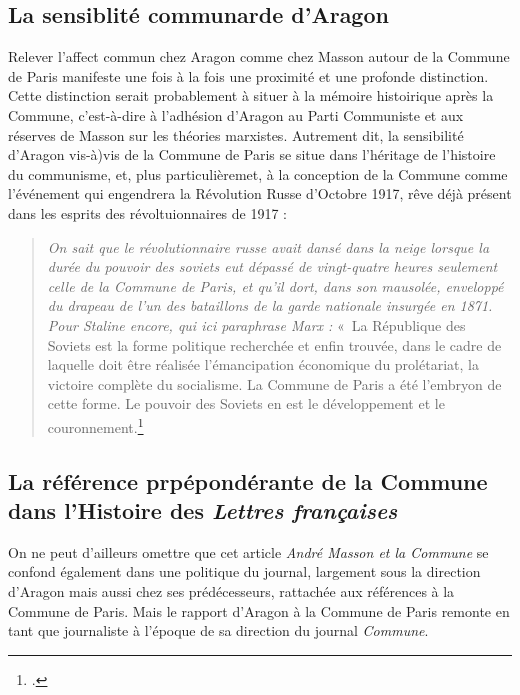 \subsection{La sensiblité communarde d'Aragon}

Relever l'affect commun chez Aragon comme chez Masson autour de la Commune de Paris manifeste une fois à la fois une proximité et une profonde distinction. Cette distinction serait probablement à situer à la mémoire histoirique après la Commune, c'est-à-dire à l'adhésion d'Aragon au Parti Communiste et aux réserves de Masson sur les théories marxistes. Autrement dit, la sensibilité d'Aragon vis-à)vis de la Commune de Paris se situe dans l'héritage de l'histoire du communisme, et, plus particulièremet, à la conception de la Commune comme l'événement qui engendrera la Révolution Russe d'Octobre 1917, rêve déjà présent dans les esprits des révoltuionnaires de 1917 : 

\begin{quote}
\emph{On sait que le révolutionnaire russe avait dansé dans la neige lorsque la durée du pouvoir des soviets eut dépassé de vingt-quatre heures seulement celle de la Commune de Paris, et qu’il dort, dans son mausolée, enveloppé du drapeau de l’un des bataillons de la garde nationale insurgée en 1871. Pour Staline encore, qui ici paraphrase Marx :} « La République des Soviets est la forme politique recherchée et enfin trouvée, dans le cadre de laquelle doit être réalisée l’émancipation économique du prolétariat, la victoire complète du  socialisme. La Commune de Paris a été l’embryon de cette forme. Le pouvoir des Soviets en est le développement et le couronnement.\footcite[p241]{proces}\end{quote}




\subsection{La référence prpépondérante de la Commune dans l'Histoire des \emph{Lettres françaises}}

 On ne peut d’ailleurs omettre que cet article \emph{André Masson et la Commune} se confond également dans une politique du journal, largement sous la direction d’Aragon mais aussi chez ses prédécesseurs, rattachée aux références à la Commune de Paris. Mais le rapport d’Aragon à la Commune de Paris remonte en tant que journaliste à l’époque de sa direction du journal \emph{Commune}. 

